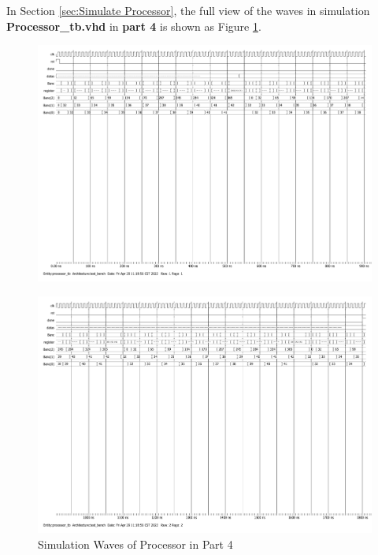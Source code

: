 \documentclass[12pt,a4paper]{article}
\begin{document}
In Section \ref{sec:Simulate Processor}, 
the full view of the waves in simulation \textbf{Processor\_tb.vhd} in \textbf{part 4} is shown 
as Figure \ref{fig:ModelSim_ processeur_tb(bench)}.
\begin{figure}[htp]
  \centering
    \includegraphics[width=1.5\textwidth,angle = 270]{picture/ModelSim_ processeur_tb(bench) 1.pdf}
\end{figure}

\begin{figure}[htp]
  \centering
    \includegraphics[width=1.5\textwidth,angle = 270]{picture/ModelSim_ processeur_tb(bench) 2.pdf}
    \caption{Simulation Waves of Processor in Part 4}  
  \label{fig:ModelSim_ processeur_tb(bench)}
\end{figure}
\end{document}
